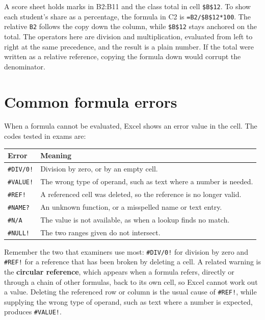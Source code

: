 \begin{example}
A score sheet holds marks in B2:B11 and the class total in cell \texttt{\$B\$12}.
To show each student's share as a percentage, the formula in C2 is
\texttt{=B2/\$B\$12*100}. The relative \texttt{B2} follows the copy down the
column, while \texttt{\$B\$12} stays anchored on the total. The operators here
are division and multiplication, evaluated from left to right at the same
precedence, and the result is a plain number. If the total were written as a
relative reference, copying the formula down would corrupt the denominator.
\end{example}

\section{Common formula errors}
When a formula cannot be evaluated, Excel shows an error value in the cell.
The codes tested in exams are:

\begin{center}
\begin{tabular}{p{}p{}}
\toprule
\textbf{Error} & \textbf{Meaning} \\
\midrule
\texttt{\#DIV/0!} & Division by zero, or by an empty cell. \\
\texttt{\#VALUE!} & The wrong type of operand, such as text where a number is needed. \\
\texttt{\#REF!} & A referenced cell was deleted, so the reference is no longer valid. \\
\texttt{\#NAME?} & An unknown function, or a misspelled name or text entry. \\
\texttt{\#N/A} & The value is not available, as when a lookup finds no match. \\
\texttt{\#NULL!} & The two ranges given do not intersect. \\
\bottomrule
\end{tabular}
\end{center}

Remember the two that examiners use most: \texttt{\#DIV/0!} for division by
zero and \texttt{\#REF!} for a reference that has been broken by deleting a
cell. A related warning is the \textbf{circular reference}, which appears when
a formula refers, directly or through a chain of other formulas, back to its
own cell, so Excel cannot work out a value. Deleting the referenced row or
column is the usual cause of \texttt{\#REF!}, while supplying the wrong type
of operand, such as text where a number is expected, produces
\texttt{\#VALUE!}.

